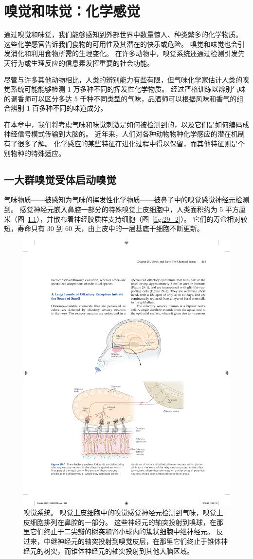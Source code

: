 \chapter{嗅觉和味觉：化学感觉} \label{chap:chap29}

通过嗅觉和味觉，我们能够感知到外部世界中数量惊人、种类繁多的化学物质。
这些化学感官告诉我们食物的可用性及其潜在的快乐或危险。
嗅觉和味觉也会引发消化和利用食物所需的生理变化。
在许多动物中，嗅觉系统还通过检测引发先天行为或生理反应的信息素发挥重要的社会功能。


尽管与许多其他动物相比，人类的辨别能力有些有限，但气味化学家估计人类的嗅觉系统可能能够检测 1 万多种不同的挥发性化学物质。
经过严格训练以辨别气味的调香师可以区分多达 5 千种不同类型的气味，品酒师可以根据风味和香气的组合辨别 1 百多种不同的味道成分。


在本章中，我们将考虑气味和味觉刺激是如何被检测到的，以及它们是如何编码成神经信号模式传输到大脑的。
近年来，人们对各种动物物种化学感应的潜在机制有了很多了解。
化学感应的某些特征在进化过程中得以保留，而其他特征则是个别物种的特殊适应。



\section{一大群嗅觉受体启动嗅觉}

气味物质——被感知为气味的挥发性化学物质——被鼻子中的嗅觉感觉神经元检测到。
感觉神经元嵌入鼻腔一部分的特殊嗅觉上皮细胞中，人类面积约为 5 平方厘米（图~\ref{fig:29_1}），并散布着神经胶质样支持细胞（图~\ref{fig:29_2}）。
它们的寿命相对较短，寿命只有 30 到 60 天，由上皮中的一层基底干细胞不断更新。


\begin{figure}[htbp]
	\centering
	\includegraphics[width=0.7\linewidth]{chap29/fig_29_1}
	\caption{嗅觉系统。
	嗅觉上皮细胞中的嗅觉感觉神经元检测到气味，嗅觉上皮细胞排列在鼻腔的一部分。
	这些神经元的轴突投射到嗅球，在那里它们终止于二尖瓣的树突和肾小球内的簇状细胞中继神经元。
	反过来，中继神经元的轴突投射到嗅觉皮层，在那里它们终止于锥体神经元的树突，而锥体神经元的轴突投射到其他大脑区域。}
	\label{fig:29_1}
\end{figure}



